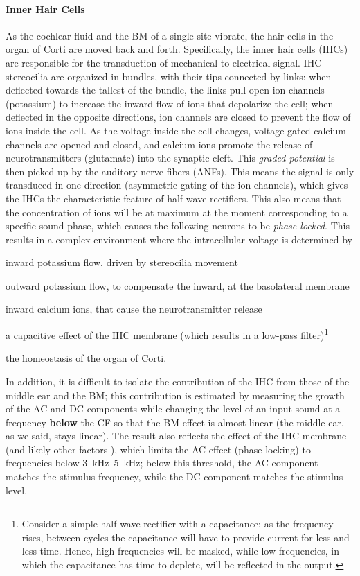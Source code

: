 \documentclass[11pt,a4paper]{article}
\begin{document}
\paragraph{Inner Hair Cells}\label{bio-IHC}
As the cochlear fluid and the BM of a single site vibrate, the hair cells in the organ of Corti are moved back and forth. Specifically, the inner hair cells (IHCs) are responsible for the transduction of mechanical to electrical signal. IHC stereocilia are organized in bundles, with their tips connected by links: when deflected towards the tallest of the bundle, the links pull open ion channels (potassium) to increase the inward flow of ions that depolarize the cell; when deflected in the opposite directions, ion channels are closed to prevent the flow of ions inside the cell. As the voltage inside the cell changes, voltage-gated calcium channels are opened and closed, and calcium ions promote the release of neurotransmitters (glutamate) into the synaptic cleft. This \textit{graded potential} is then picked up by the auditory nerve fibers (ANFs). This means the signal is only transduced in one direction (asymmetric gating of the ion channels), which gives the IHCs the characteristic feature of half-wave rectifiers. This also means that the concentration of ions will be at maximum at the moment corresponding to a specific sound phase, which causes the following neurons to be \textit{phase locked}. This results in a complex environment where the intracellular voltage is determined by
\begin{inlinelist}
    \item inward potassium flow, driven by stereocilia movement
    \item outward potassium flow, to compensate the inward, at the basolateral membrane
    \item inward calcium ions, that cause the neurotransmitter release
    \item a capacitive effect of the IHC membrane (which results in a low-pass filter)\footnote{Consider a simple half-wave rectifier with a capacitance: as the frequency rises, between cycles the capacitance will have to provide current for less and less time. Hence, high frequencies will be masked, while low frequencies, in which the capacitance has time to deplete, will be reflected in the output.}
    \item the homeostasis of the organ of Corti.
\end{inlinelist}
In addition, it is difficult to isolate the contribution of the IHC from those of the middle ear and the BM; this contribution is estimated by measuring the growth of the AC and DC components while changing the level of an input sound at a frequency \textbf{below} the CF so that the BM effect is almost linear (the middle ear, as we said, stays linear). The result also reflects the effect of the IHC membrane (and likely other factors \cite{weissComparisonSynchronizationFilters1988}), which limits the AC effect (phase locking) to frequencies below \qtyrange[range-units=single,range-phrase=\,to\,]{3}{5}{\kilo\hertz}; below this threshold, the AC component matches the stimulus frequency, while the DC component matches the stimulus level.
\end{document}
